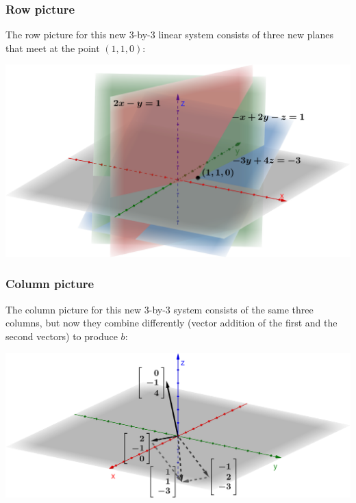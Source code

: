 \documentclass[../main.tex]{subfiles}
\begin{document}
\subsubsection{Row picture}
The row picture for this new 3-by-3 linear system consists of three new planes that meet at the point \((1, 1, 0)\):

\begingroup
\centering
\includegraphics[width = \columnwidth]{../figures/fig05_3d-row-pic-new-rhs/geogebra-derived}
\par
\endgroup

\subsubsection{Column picture}
The column picture for this new 3-by-3 system consists of the same three columns, but now they combine differently (vector addition of the first and the second vectors) to produce \(b\):

\begingroup
\centering
\includegraphics[width = \columnwidth]{../figures/fig06_3d-col-pic-new-rhs/geogebra-derived}
\par
\endgroup


\end{document}
